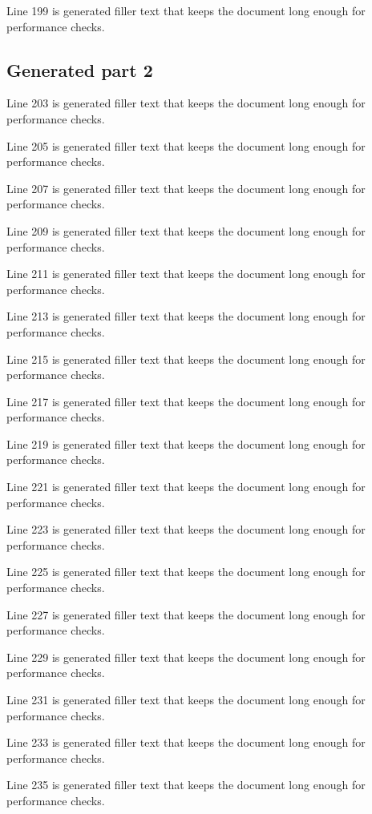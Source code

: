 Line 199 is generated filler text that keeps the document long enough for performance checks.

\subsection{Generated part 2}

Line 203 is generated filler text that keeps the document long enough for performance checks.

Line 205 is generated filler text that keeps the document long enough for performance checks.

Line 207 is generated filler text that keeps the document long enough for performance checks.

Line 209 is generated filler text that keeps the document long enough for performance checks.

Line 211 is generated filler text that keeps the document long enough for performance checks.

Line 213 is generated filler text that keeps the document long enough for performance checks.

Line 215 is generated filler text that keeps the document long enough for performance checks.

Line 217 is generated filler text that keeps the document long enough for performance checks.

Line 219 is generated filler text that keeps the document long enough for performance checks.

Line 221 is generated filler text that keeps the document long enough for performance checks.

Line 223 is generated filler text that keeps the document long enough for performance checks.

Line 225 is generated filler text that keeps the document long enough for performance checks.

Line 227 is generated filler text that keeps the document long enough for performance checks.

Line 229 is generated filler text that keeps the document long enough for performance checks.

Line 231 is generated filler text that keeps the document long enough for performance checks.

Line 233 is generated filler text that keeps the document long enough for performance checks.

Line 235 is generated filler text that keeps the document long enough for performance checks.

